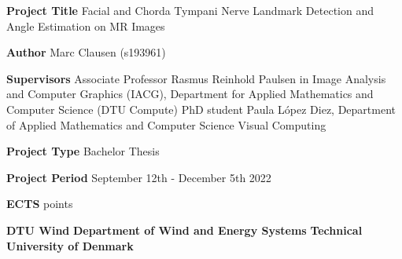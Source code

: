 \thispagestyle{empty}
\vspace*{\fill}

\textbf{Project Title} \newline 
Facial and Chorda Tympani Nerve Landmark Detection and Angle Estimation on MR Images

\frieze

\bigskip 

\textbf{Author} \newline
Marc Clausen (s193961)

\bigskip  

\textbf{Supervisors}\newline
Associate Professor Rasmus Reinhold Paulsen in Image Analysis and Computer Graphics (IACG), Department for Applied Mathematics and Computer Science (DTU Compute)\newline  
PhD student Paula López  Diez, Department of Applied Mathematics and Computer Science
Visual Computing
\bigskip 
\bigskip 

\textbf{Project Type} \newline
Bachelor Thesis 

\bigskip 
\textbf{Project Period} \newline 
September 12th - December 5th 2022

\bigskip 
\textbf{ECTS} points 

\bigskip 

\textbf{DTU Wind} \newline 
\textbf{Department of Wind and Energy Systems} \newline 
\textbf{Technical University of Denmark}



